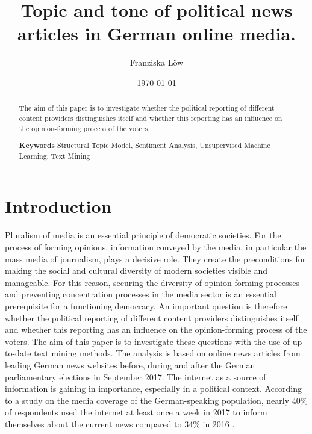 \documentclass[12pt,a4paper,notitlepage]{article}
\title{Topic and tone of political news articles in German online media.}
\date{\today}
\author{Franziska Löw}
\begin{document}
\begin{titlepage}
	\maketitle
	\begin{abstract}
		The aim of this paper is to investigate whether the political reporting of different content providers distinguishes itself and whether this reporting has an influence on the opinion-forming process of the voters. 
		
		\textbf{Keywords} Structural Topic Model, Sentiment Analysis, Unsupervised Machine Learning, Text Mining

	\end{abstract}

\end{titlepage}

\tableofcontents

\section{Introduction}

Pluralism of media is an essential principle of democratic societies. For the process of forming opinions, information conveyed by the media, in particular the mass media of journalism, plays a decisive role. They create the preconditions for making the social and cultural diversity of modern societies visible and manageable. For this reason, securing the diversity of opinion-forming processes and preventing concentration processes in the media sector is an essential prerequisite for a functioning democracy. An important question is therefore whether the political reporting of different content providers distinguishes itself and whether this reporting has an influence on the opinion-forming process of the voters. The aim of this paper is to investigate these questions with the use of up-to-date text mining methods. The analysis is based on online news articles from leading German news websites before, during and after the German parliamentary elections in September 2017. The internet as a source of information is gaining in importance, especially in a political context. According to a study on the media coverage of the German-speaking population, nearly 40\% of respondents used the internet at least once a week in 2017 to inform themselves about the current news compared to 34\% in 2016 \citep{vuma_arbeitsgemeinschaft_verbrauchs-_und_medienanalyse_verbrauchs-_2017}.
\end{document}
